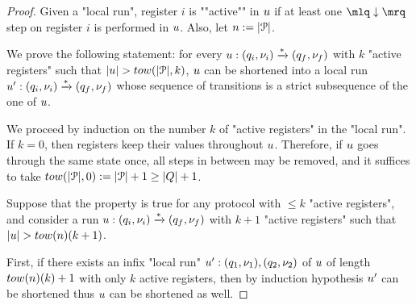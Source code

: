 \begin{proof}

Given a "local run", register $i$ is ""active"" in $u$ if at least one $\quotemarks{\enregact}$ step on register $i$ is performed in $u$. Also, let $n:=|\mathcal{P}|$.

We prove the following statement:
for every $u: (q_i, \nu_i) \xrightarrow{*} (q_f, \nu_f)$ with $k$ "active registers" such that $\length{\localrun} > \towerfun(|\prot|,k)$, $u$ can be shortened into a local run $u': (q_i, \nu_i) \xrightarrow{*} (q_f, \nu_f)$ whose sequence of transitions is a strict subsequence of the one of $u$. 

We proceed by induction on the number $k$ of "active registers" in the "local run". If $k=0$, then registers keep their values throughout $u$. Therefore, if $u$ goes through the same state once, all steps in between may be removed, and it suffices to take $\towerfun(\size{\prot}, 0) := |\prot| + 1 \geq |Q| +1$.  

Suppose that the property is true for any protocol with $\leq k$ "active registers", and consider a run $u: (q_i,\nu_i) \xrightarrow{*} (q_f,\nu_f)$ with $k+1$ "active registers" such that $\length{\localrun} > \towerfun(n)(k+1)$.

First, if there exists an infix "local run" $u': (q_1, \nu_1), (q_2, \nu_2)$ of $u$ of length $\towerfun(n)(k)+1$ with only $k$ active registers, then by induction hypothesis $u'$ can be shortened thus $u$ can be shortened as well.


\end{proof}

